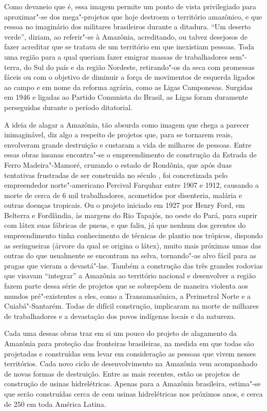 Como devaneio que é, essa imagem permite um ponto de vista privilegiado
para aproximar"-se dos mega"-projetos que hoje destroem o território
amazônico, e que ressoa no imaginário dos militares
brasileiros durante a ditadura. ``Um deserto verde'', diziam, ao
referir"-se à Amazônia, acreditando, ou talvez desejosos de fazer
acreditar que se tratava de um território em que inexistiam pessoas.
Toda uma região para a qual queriam fazer emigrar massas de
trabalhadores sem"-terra, do Sul do país e da região Nordeste,
retirando"-os da seca com promessas fáceis ou com o objetivo de diminuir
a força de movimentos de esquerda ligados ao campo e em nome da reforma
agrária, como as Ligas Camponesas. Surgidas em 1946 e ligadas ao Partido
Comunista do Brasil, as Ligas foram duramente perseguidas durante o
período ditatorial.

A ideia de alagar a Amazônia, tão absurda como imagem que chega a parecer inimaginável, diz algo a respeito de projetos que, para se tornarem
reais, envolveram grande destruição e custaram a vida de milhares de
pessoas. Entre essas obras insanas encontra"-se o empreendimento de
construção da Estrada de Ferro Madeira"-Mamoré, cruzando o estado de
Rondônia, que após duas tentativas frustradas de ser construída no
século , foi concretizada pelo empreendedor norte"-americano Percival
Farquhar entre 1907 e 1912, causando a morte de cerca de 6 mil
trabalhadores, acometidos por disenteria, malária e outras doenças
tropicais. Ou o projeto iniciado em 1927 por Henry Ford, em Belterra
e Fordlândia, às margens do Rio Tapajós, no oeste do Pará, para suprir com látex suas fábricas de pneus, e que faliu,
já que nenhum dos gerentes do empreendimento tinha conhecimento de
técnicas de plantio nos trópicos, dispondo as seringueiras (árvore da
qual se origina o látex), muito mais próximas umas das outras do que
usualmente se encontram na selva, tornando"-as alvo fácil para as pragas
que vieram a devastá"-las. Também a construção das três grandes rodovias
que visavam ``integrar'' a Amazônia ao território nacional e desenvolver a
região fazem parte dessa série de projetos que se sobrepõem de maneira
violenta aos mundos pré"-existentes a eles, como a Transamazônica, a
Perimetral Norte e a Cuiabá"-Santarém. Todas de difícil construção,
implicaram na morte de milhares de trabalhadores e a devastação dos
povos indígenas locais e da natureza.

Cada uma dessas obras traz em si um pouco do projeto de alagamento da
Amazônia para proteção das fronteiras brasileiras, na medida em que
todas são projetadas e construídas sem levar em consideração as pessoas
que vivem nesses territórios. Cada novo ciclo de desenvolvimento na
Amazônia vem acompanhado de novas formas de destruição. Entre as mais
recentes, estão os projetos de construção de usinas hidrelétricas.
Apenas para a Amazônia brasileira, estima"-se que serão
construídas cerca de cem usinas hidrelétricas nos próximos anos, e cerca
de 250 em toda América Latina.


